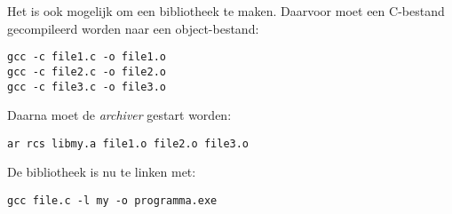 Het is ook mogelijk om een bibliotheek te maken. Daarvoor moet een C-bestand gecompileerd worden naar een object-bestand:

\hspace*{1em}\texttt{gcc -c file1.c -o file1.o}\\
\hspace*{1em}\texttt{gcc -c file2.c -o file2.o}\\
\hspace*{1em}\texttt{gcc -c file3.c -o file3.o}

Daarna moet de \textsl{archiver} gestart worden:

\hspace*{1em}\texttt{ar rcs libmy.a file1.o file2.o file3.o}

De bibliotheek is nu te linken met:

\hspace*{1em}\texttt{gcc file.c -l my -o programma.exe}

